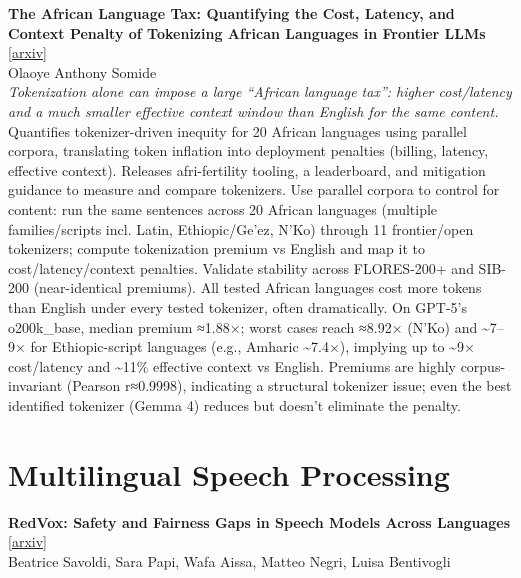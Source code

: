 \documentclass[12pt,letterpaper]{article}
\begin{document}
\medskip

{\small\textbf{The African Language Tax: Quantifying the Cost, Latency, and Context Penalty of Tokenizing African Languages in Frontier LLMs}} {\scriptsize[\href{https://arxiv.org/abs/2606.24460}{arxiv}]}\\
{\scriptsize Olaoye Anthony Somide}\\

{\small\textit{Tokenization alone can impose a large ``African language tax'': higher cost/latency and a much smaller effective context window than English for the same content.}}\\[1pt]
{\footnotesize Quantifies tokenizer-driven inequity for 20 African languages using parallel corpora, translating token inflation into deployment penalties (billing, latency, effective context). Releases afri-fertility tooling, a leaderboard, and mitigation guidance to measure and compare tokenizers. Use parallel corpora to control for content: run the same sentences across 20 African languages (multiple families/scripts incl. Latin, Ethiopic/Ge'ez, N'Ko) through 11 frontier/open tokenizers; compute tokenization premium vs English and map it to cost/latency/context penalties. Validate stability across FLORES-200+ and SIB-200 (near-identical premiums). All tested African languages cost more tokens than English under every tested tokenizer, often dramatically. On GPT-5's o200k\_base, median premium ≈1.88×; worst cases reach ≈8.92× (N'Ko) and \textasciitilde{}7--9× for Ethiopic-script languages (e.g., Amharic \textasciitilde{}7.4×), implying up to \textasciitilde{}9× cost/latency and \textasciitilde{}11\% effective context vs English. Premiums are highly corpus-invariant (Pearson r≈0.9998), indicating a structural tokenizer issue; even the best identified tokenizer (Gemma 4) reduces but doesn't eliminate the penalty.}

\medskip


\section*{Multilingual Speech Processing}

{\small\textbf{RedVox: Safety and Fairness Gaps in Speech Models Across Languages}} {\scriptsize[\href{https://arxiv.org/abs/2606.26968}{arxiv}]}\\
{\scriptsize Beatrice Savoldi, Sara Papi, Wafa Aissa, Matteo Negri, Luisa Bentivogli}\\
\end{document}
